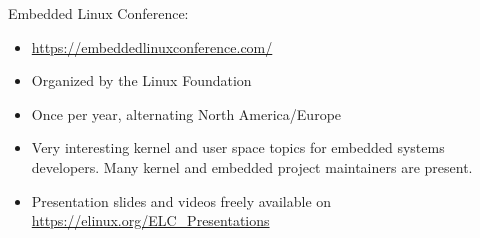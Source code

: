\item Embedded Linux Conference:
  \begin{itemize}
  \item \url{https://embeddedlinuxconference.com/}
  \item Organized by the Linux Foundation
  \item Once per year, alternating North America/Europe
  \item Very interesting kernel and user space topics for embedded
        systems developers. Many kernel and embedded project maintainers are present.
  \item Presentation slides and videos freely available on
    \url{https://elinux.org/ELC_Presentations} 
  \end{itemize}
